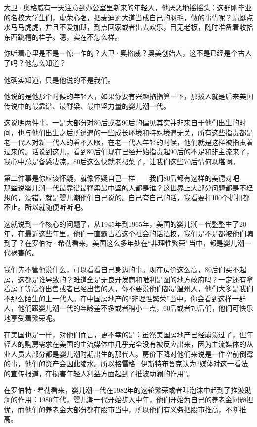 大卫·奥格威有一天注意到办公室里新来的年轻人，他厌恶地摇摇头：这群刚毕业的名校大学生们，虚荣心强，把麦迪逊大道当成自己的羽毛，做的事情呢？蜻蜓点水马马虎虎，并且不爱加班，到点回家或者出去欢乐，目无老板，随时准备着收拾东西跳槽的样子。嗯，实在不怎么样。

你听着心里是不是一惊一乍的？大卫·奥格威？奥美创始人，这不是已经是个古人了吗？他怎么知道？

他确实知道，只是他说的不是我们。

他说的是他那个时候的年轻人，如果你要有兴趣掐指算一下，那拨人就是后来美国传说中的最靠谱、最脊梁、最中坚力量的婴儿潮一代。

这说明两件事，一是大部分对80后或者90后的偏见其实并非来自于他们出生的时间，也与他们出生之后所遭遇的一些成长环境和特殊境遇无关，所有这些指责都是老一代人对新一代人的看不入眼，在老一代人年轻的时候，他们就是这样被指责着过来的。话说到这儿，看到80后们现在已经开始指责起90后的不足和非主流来了，我心中总是备感凄凉，80后这么快就老帮菜了，让我们这些70后情何以堪啊。

第二件事是你应该怀疑，就像怀疑自己一样------我们80后都有这样的美德对吧------那些说婴儿潮一代最靠谱最脊梁最中坚的人都是谁？这世界上大部分问题都是不经想的，没错，就是婴儿潮他们自己说的。自己夸自己的话，我看要打100个折扣都不止。所以就随便听听吧。

这就说到一个核心的问题了，从1945年到1965年，美国的婴儿潮一代整整生了20年，在最近这些年里，他们一直霸占着这个社会的话语权，我们是不是都被他们骗到了？在罗伯特·希勒看来，美国这么多年处在``非理性繁荣''当中，都是婴儿潮一代祸害的。

我们先不管他说什么，可以看看自己身边的事。现在房价这么高，80后们买不起房，这都是谁导致的？难道全是无良开发商和唯利是图的地方政府吗？一定还有拿着房子等高价出售或者已经出售的人，你不要说他们都是温州人，他们大多是我们不那么陌生的上一代人。在中国房地产的``非理性繁荣''当中，你会看到这样一群人，他们跟婴儿潮一代的年龄差不多或者稍小一点，60后或者70后们，他们可快乐地享受着繁荣呢。

在美国也是一样，对他们而言，更不幸的是：虽然美国房地产已经崩溃过了，但年轻人的购房需求在美国的主流媒体中几乎完全没有被反应出来，因为主流媒体的从业人员大部分都是婴儿潮时期出生的那代人。房价下降对他们来说是一件空前倒霉的事，他们的资产会因此缩水。所以格雷格·伊斯特布鲁克认为``媒体对这一看法的宣传报道，在损害年轻人利益方面起到了推波助澜的作用''。

在罗伯特·希勒看来，婴儿潮一代在1982年的这轮繁荣或者叫泡沫中起到了推波助澜的作用：1980年代，婴儿潮一代开始步入中年，他们开始为自己的养老金问题担忧，而他们的养老金大部分都在股市当中，所以他们有义务把股市推高，不断推高。

